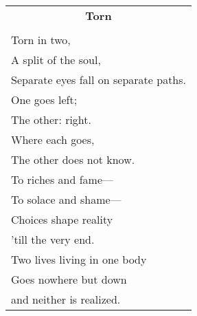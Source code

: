 \documentclass{article}
\begin{document}
\newcommand{\h}{\hspace*{4ex}}

\begin{center}
\begin{tabular}{l}
\multicolumn{1}{c}{\large\textbf{Torn}} \\
\\
Torn in two, \\
A split of the soul, \\
Separate eyes fall on separate paths. \\
One goes left; \\
The other:  right. \\
Where each goes, \\
The other does not know. \\
To riches and fame--- \\
To solace and shame--- \\
Choices shape reality \\
'till the very end. \\
Two lives living in one body \\
Goes nowhere but down \\
and neither is realized. \\
\end{tabular}
\end{center}
\end{document}
